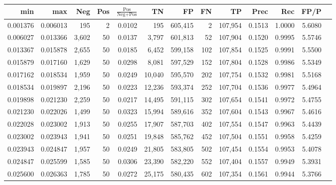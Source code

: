 \begin{tabular}{rrrrrrrrrrrrr}
\toprule
     min &      max &   Neg & Pos & $\frac{\text{Pos}}{\text{Neg}+\text{Pos}}$ &      TN &      FP &      FN &      TP &   Prec &    Rec &   FP/P \\
\midrule
0.001376 & 0.006013 &   195 &   2 &                                     0.0102 &     195 & 605,415 &       2 & 107,954 & 0.1513 & 1.0000 & 5.6080 \\
0.006027 & 0.013366 & 3,602 &  50 &                                     0.0137 &   3,797 & 601,813 &      52 & 107,904 & 0.1520 & 0.9995 & 5.5746 \\
0.013367 & 0.015878 & 2,655 &  50 &                                     0.0185 &   6,452 & 599,158 &     102 & 107,854 & 0.1525 & 0.9991 & 5.5500 \\
0.015879 & 0.017160 & 1,629 &  50 &                                     0.0298 &   8,081 & 597,529 &     152 & 107,804 & 0.1528 & 0.9986 & 5.5349 \\
0.017162 & 0.018534 & 1,959 &  50 &                                     0.0249 &  10,040 & 595,570 &     202 & 107,754 & 0.1532 & 0.9981 & 5.5168 \\
0.018534 & 0.019897 & 2,196 &  50 &                                     0.0223 &  12,236 & 593,374 &     252 & 107,704 & 0.1536 & 0.9977 & 5.4964 \\
0.019898 & 0.021230 & 2,259 &  50 &                                     0.0217 &  14,495 & 591,115 &     302 & 107,654 & 0.1541 & 0.9972 & 5.4755 \\
0.021230 & 0.022026 & 1,499 &  50 &                                     0.0323 &  15,994 & 589,616 &     352 & 107,604 & 0.1543 & 0.9967 & 5.4616 \\
0.022028 & 0.023002 & 1,913 &  50 &                                     0.0255 &  17,907 & 587,703 &     402 & 107,554 & 0.1547 & 0.9963 & 5.4439 \\
0.023002 & 0.023943 & 1,941 &  50 &                                     0.0251 &  19,848 & 585,762 &     452 & 107,504 & 0.1551 & 0.9958 & 5.4259 \\
0.023943 & 0.024847 & 1,957 &  50 &                                     0.0249 &  21,805 & 583,805 &     502 & 107,454 & 0.1554 & 0.9953 & 5.4078 \\
0.024847 & 0.025599 & 1,585 &  50 &                                     0.0306 &  23,390 & 582,220 &     552 & 107,404 & 0.1557 & 0.9949 & 5.3931 \\
0.025600 & 0.026363 & 1,785 &  50 &                                     0.0272 &  25,175 & 580,435 &     602 & 107,354 & 0.1561 & 0.9944 & 5.3766 \\

\end{tabular}
